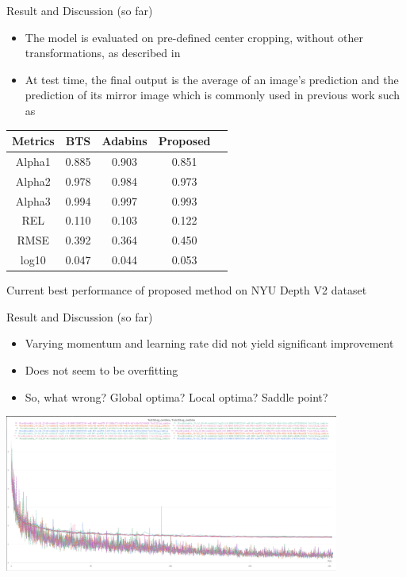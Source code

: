 \documentclass[10pt]{beamer}
\begin{document}
\begin{frame}{Result and Discussion (so far)}
    \begin{itemize}
        \item The model is evaluated on pre-defined center cropping, without other transformations, as described in \cite{eigen}
        \item At test time, the final output is the average of an image’s prediction and the prediction of its mirror image which is commonly used in previous work such as \cite{adabins}
    \end{itemize}
    
    

    \begin{table}[]
        \begin{tabular}{|c|c|c|c|c|}
        \hline
        \textbf{Metrics} & \textbf{BTS} & \textbf{Adabins} & \textbf{Proposed} \\ \hline
        Alpha1           & 0.885        & 0.903            & 0.851   \\ \hline
        Alpha2           & 0.978        & 0.984            & 0.973  \\ \hline
        Alpha3           & 0.994        & 0.997            & 0.993   \\ \hline
        REL              & 0.110        & 0.103            & 0.122  \\ \hline
        RMSE             & 0.392        & 0.364            & 0.450    \\ \hline
        log10            & 0.047        & 0.044            & 0.053    \\ \hline
        \end{tabular}
    \end{table}\par
    \centering
    Current best performance of proposed method on NYU Depth V2 dataset
    
\end{frame}

\begin{frame}{Result and Discussion (so far)}
    \begin{itemize}
        \item Varying momentum and learning rate did not yield significant improvement
        \item Does not seem to be overfitting
        \item So, what wrong? Global optima? Local optima? Saddle point?
    \end{itemize}
    \centering
    \includegraphics[width=11cm]{sweep_result.png}
\end{frame}
\end{document}
